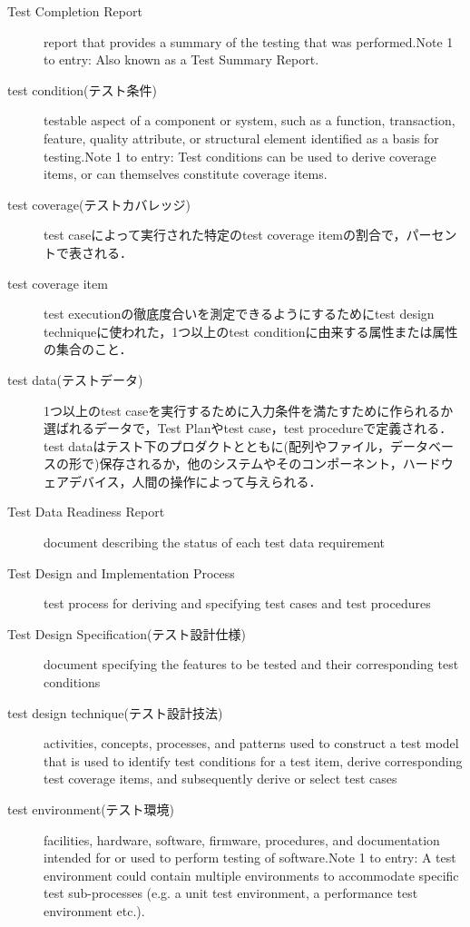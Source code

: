 \begin{description}
    \item[Test Completion Report]report that provides a summary of the testing that was performed.Note 1 to entry: Also known as a Test Summary Report.
    \item[test condition(テスト条件)]testable aspect of a component or system, such as a function, transaction, feature, quality attribute, or structural element identified as a basis for testing.Note 1 to entry: Test conditions can be used to derive coverage items, or can themselves constitute coverage items.
    \item[test coverage(テストカバレッジ)]test caseによって実行された特定のtest coverage itemの割合で，パーセントで表される．
    \item[test coverage item]test executionの徹底度合いを測定できるようにするためにtest design techniqueに使われた，1つ以上のtest conditionに由来する属性または属性の集合のこと．
    \item[test data(テストデータ)]1つ以上のtest caseを実行するために入力条件を満たすために作られるか選ばれるデータで，Test Planやtest case，test procedureで定義される．test dataはテスト下のプロダクトとともに(配列やファイル，データベースの形で)保存されるか，他のシステムやそのコンポーネント，ハードウェアデバイス，人間の操作によって与えられる．
    \item[Test Data Readiness Report]document describing the status of each test data requirement
    \item[Test Design and Implementation Process]test process for deriving and specifying test cases and test procedures
    \item[Test Design Specification(テスト設計仕様)]document specifying the features to be tested and their corresponding test conditions
    \item[test design technique(テスト設計技法)]activities, concepts, processes, and patterns used to construct a test model that is used to identify test conditions for a test item, derive corresponding test coverage items, and subsequently derive or select test cases
    \item[test environment(テスト環境)]facilities, hardware, software, firmware, procedures, and documentation intended for or used to perform testing of software.Note 1 to entry: A test environment could contain multiple environments to accommodate specific test sub-processes (e.g. a unit test environment, a performance test environment etc.).

\end{description}
